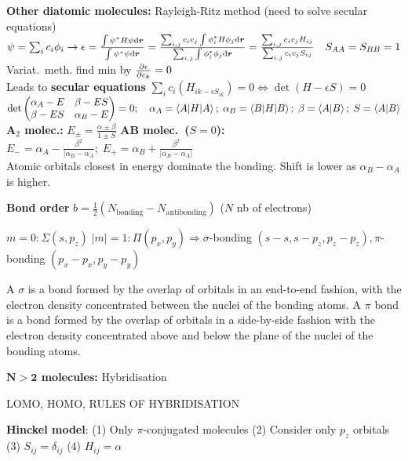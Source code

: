 \begin{squishlist}
    \item \textbf{Other diatomic molecules:} Rayleigh-Ritz method (need to solve secular equations)\\
    $\psi = \sum_i c_i \phi_i \rightarrow \epsilon = \frac{\int \psi^* H \psi \textrm{d} \bm{r}}{\int \psi^* \psi \textrm{d} \bm{r}} = \frac{\sum_{i,j}c_ic_j \int \phi_i^* H \phi_j \textrm{d} \bm{r}}{\sum_{i,j}\int \phi_i^* \phi_j \textrm{d} \bm{r}} = \frac{\sum_{i,j}c_i c_j H_{ij}}{\sum_{i,j}c_i c_j S_{ij}} \quad S_{AA} = S_{BB} = 1$\\
    Variat.\ meth.\: find min by $\frac{\partial \epsilon}{\partial c_k} = 0$ \\
    Leads to \textbf{secular equations} $\sum_i c_i (H_{ik - \epsilon S_{ik}}) = 0 \Longleftrightarrow \det(H - \epsilon S) = 0$\\
    $\det \begin{pmatrix}
        \alpha_A - E & \beta - ES \\
        \beta - ES   & \alpha_B - E
    \end{pmatrix} = 0; \quad \alpha_A = \braket{A|H|A};\; \alpha_B = \braket{B|H|B};\; \beta = \braket{A|B};\; S = \braket{A|B}$ \\
    \textbf{A$_2$ molec.:} $E_{\pm} = \frac{\alpha \pm \beta}{1\pm S}$ \qquad
    \textbf{AB molec.\ ($S=0$):} $E_- = \alpha_A - \frac{\beta^2}{|\alpha_B - \alpha_A};\; E_+ = \alpha_B + \frac{\beta^2}{|\alpha_B - \alpha_A|}$  \\Atomic orbitals closest in energy dominate the bonding. Shift is lower as $\alpha_B - \alpha_A$ is higher.

    \item \textbf{Bond order} $b = \frac{1}{2} (N_{\text{bonding}} - N_{\text{antibonding}})$ ($N$ nb of electrons)
    
    \item $m=0 : \Sigma (s, p_z) \; |m|=1 : \Pi (p_x, p_y) \Longrightarrow \sigma$-bonding $(s-s, s-p_z, p_z-p_z), \pi$-bonding $(p_x-p_x, p_y-p_y)$
    \item A $\sigma$ is a bond formed by the overlap of orbitals in an end-to-end fashion, with the electron density concentrated between the nuclei of the bonding atoms. A $\pi$  bond is a bond formed by the overlap of orbitals in a side-by-side fashion with the electron density concentrated above and below the plane of the nuclei of the bonding atoms.
\end{squishlist}

\squishline

\begin{squishlist}
    \item \textbf{$\mathbf{N>2}$ molecules:} Hybridisation
    \item LOMO, HOMO, RULES OF HYBRIDISATION
    \item \textbf{Hinckel model}: (1) Only $\pi$-conjugated molecules (2) Consider only $p_z$ orbitals (3) $S_{ij} = \delta_{ij}$ (4) $H_{ij} = \alpha$
\end{squishlist}

